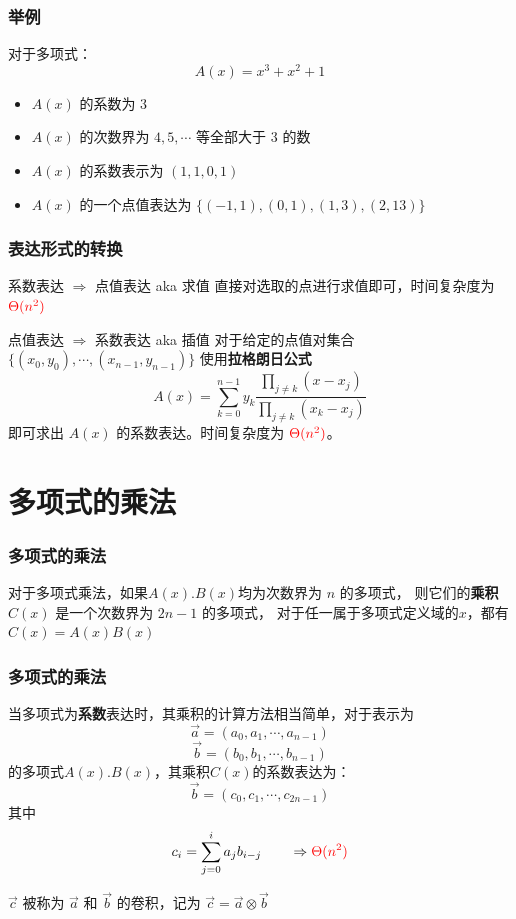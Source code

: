 \documentclass[UTF8]{ctexbeamer}
\begin{document}
\begin{frame}
    \frametitle{举例}
    对于多项式：
    $$ A(x) = x^3 + x^2 + 1 $$

    \begin{itemize}
        \item $A(x)$ 的系数为 $3$
        \item $A(x)$ 的次数界为 $4, 5, \cdots$ 等全部大于 $3$ 的数
        \item $A(x)$ 的系数表示为 $ (1, 1, 0, 1)$
        \item $A(x)$ 的一个点值表达为 $\{ (-1, 1), (0, 1), (1, 3), (2, 13) \}$
    \end{itemize}
\end{frame}

\begin{frame}
    \frametitle{表达形式的转换}
    \begin{block}{系数表达 $\Rightarrow$ 点值表达 aka 求值}
        直接对选取的点进行求值即可，时间复杂度为 $\textcolor{red}{\Theta(n^2)}$
    \end{block}
    \begin{block}{点值表达 $\Rightarrow$ 系数表达 aka 插值}
        对于给定的点值对集合 $\{ (x_0, y_0), \cdots, (x_{n-1}, y_{n-1})\}$
        使用\textbf{拉格朗日公式}
        $$A(x) = \sum_{k = 0}^{n - 1} y_k \frac{\prod_{j \neq k}(x - x_j)}{\prod_{j \neq k}(x_k - x_j)}$$
        即可求出 $A(x)$ 的系数表达。时间复杂度为 $\textcolor{red}{\Theta(n^2)}$。
    \end{block}
\end{frame}

\section{多项式的乘法}

\begin{frame}
    \frametitle{多项式的乘法}
    对于多项式乘法，如果$A(x). B(x)$均为次数界为 $n$ 的多项式，
    则它们的\textbf{乘积} $C(x)$ 是一个次数界为 $2n - 1$ 的多项式，
    对于任一属于多项式定义域的$x$，都有$C(x) = A(x)B(x)$
\end{frame}

\begin{frame}
    \frametitle{多项式的乘法}
    当多项式为\textbf{系数}表达时，其乘积的计算方法相当简单，对于表示为
    $$\vec{a} = (a_0, a_1, \cdots, a_{n-1})$$
    $$\vec{b} = (b_0, b_1, \cdots, b_{n-1})$$
    的多项式$A(x). B(x)$，其乘积$C(x)$的系数表达为：
    $$\vec{b} = (c_0, c_1, \cdots, c_{2n-1})$$
    其中
    $$c_i = \sum_{j = 0}^{i} a_j b_{i - j} \qquad \Rightarrow \textcolor{red}{\Theta(n^2)}$$
    \begin{block}{}
        $\vec{c}$ 被称为 $\vec{a}$ 和 $\vec{b}$ 的卷积，记为
        $\vec{c} = \vec{a} \otimes \vec{b}$
    \end{block}
\end{frame}
\end{document}
